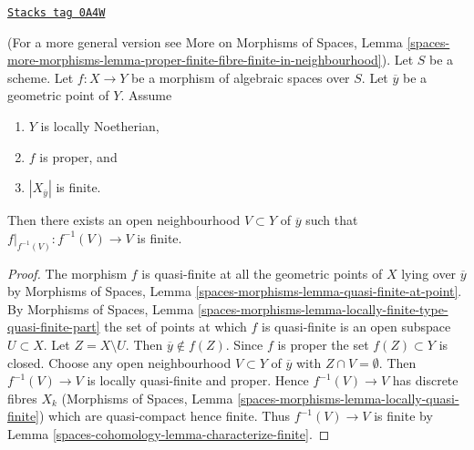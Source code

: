 \begin{lemma}
\label{spaces-cohomology-lemma-proper-finite-fibre-finite-in-neighbourhood}
\href{https://stacks.math.columbia.edu/tag/0A4W}{\texttt{Stacks tag 0A4W}}

(For a more general version see
More on Morphisms of Spaces, Lemma
\ref{spaces-more-morphisms-lemma-proper-finite-fibre-finite-in-neighbourhood}).
Let $S$ be a scheme. Let $f : X \to Y$ be a morphism of algebraic spaces
over $S$. Let $\overline{y}$ be a geometric point of $Y$.
Assume
\begin{enumerate}
\item $Y$ is locally Noetherian,
\item $f$ is proper, and
\item $|X_{\overline{y}}|$ is finite.
\end{enumerate}
Then there exists an open neighbourhood $V \subset Y$ of $\overline{y}$
such that $f|_{f^{-1}(V)} : f^{-1}(V) \to V$ is finite.
\end{lemma}

\begin{proof}
The morphism $f$ is quasi-finite at all the geometric points of $X$
lying over $\overline{y}$ by
Morphisms of Spaces, Lemma \ref{spaces-morphisms-lemma-quasi-finite-at-point}.
By Morphisms of Spaces, Lemma
\ref{spaces-morphisms-lemma-locally-finite-type-quasi-finite-part} the
set of points at which $f$ is quasi-finite is an open subspace $U \subset X$.
Let $Z = X \setminus U$. Then $\overline{y} \not \in f(Z)$. Since $f$
is proper the set $f(Z) \subset Y$ is closed. Choose any open neighbourhood
$V \subset Y$ of $\overline{y}$ with $Z \cap V = \emptyset$. Then
$f^{-1}(V) \to V$ is locally quasi-finite and proper.
Hence $f^{-1}(V) \to V$ has discrete fibres $X_k$
(Morphisms of Spaces, Lemma
\ref{spaces-morphisms-lemma-locally-quasi-finite})
which are quasi-compact hence finite.
Thus $f^{-1}(V) \to V$
is finite by Lemma \ref{spaces-cohomology-lemma-characterize-finite}.
\end{proof}



